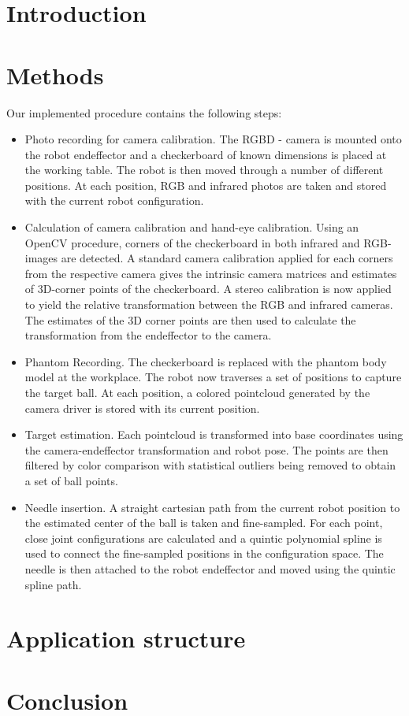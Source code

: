 \section{Introduction}


\section{Methods}
Our implemented procedure contains the following steps:
\begin{itemize}
    \item Photo recording for camera calibration. The RGBD - camera is mounted onto the robot endeffector and a checkerboard of known dimensions is placed at the working table. The robot is then moved through a number of different positions. At each position, RGB and infrared photos are taken and stored with the current robot configuration.
    \item Calculation of camera calibration and hand-eye calibration. Using an OpenCV procedure, corners of the checkerboard in both infrared and RGB-images are detected. A standard camera calibration applied for each corners from the respective camera gives the intrinsic camera matrices and estimates of 3D-corner points of the checkerboard. A stereo calibration is now applied to yield the relative transformation between the RGB and infrared cameras. The estimates of the 3D corner points are then used to calculate the transformation from the endeffector to the camera.
    \item Phantom Recording. The checkerboard is replaced with the phantom body model at the workplace. The robot now traverses a set of positions to capture the target ball. At each position, a colored pointcloud generated by the camera driver is stored with its current position.
    \item Target estimation. Each pointcloud is transformed into base coordinates using the camera-endeffector transformation and robot pose. The points are then filtered by color comparison with statistical outliers being removed to obtain a set of ball points.
    \item Needle insertion. A straight cartesian path from the current robot position to the estimated center of the ball is taken and fine-sampled. For each point, close joint configurations are calculated and a quintic polynomial spline is used to connect the fine-sampled positions in the configuration space. The needle is then attached to the robot endeffector and moved using the quintic spline path.
\end{itemize}





\section{Application structure}

\section{Conclusion}


